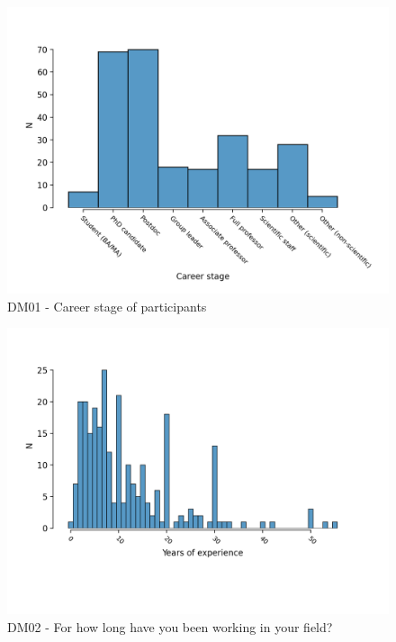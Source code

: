 \documentclass{article}
\begin{document}
\begin{figure}[!p]
    \centering
    \includegraphics[width=\textwidth]{../figs/DM01.png}
	\caption{DM01 - Career stage of participants}
    \label{fig:dm01}
\end{figure}

\begin{figure}[!p]
    \centering
    \includegraphics[width=\textwidth]{../figs/DM02_01.png}
	\caption{DM02 - For how long have you been working in your field?}
    \label{fig:dm02}
\end{figure}
\end{document}
